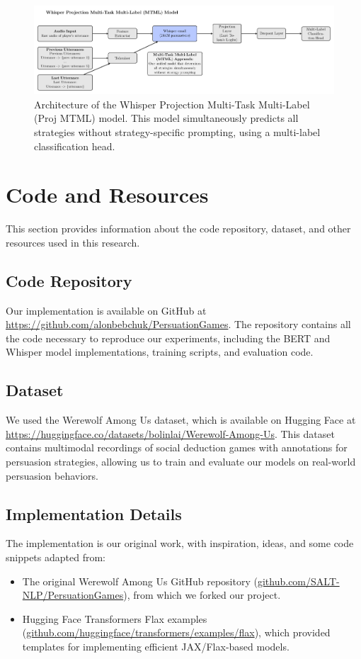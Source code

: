 \documentclass{article}
\begin{document}
\begin{figure}[H]
    \centering
    \includegraphics[width=\textwidth]{figures/pdf/whisper_proj_mtml.pdf}
    \caption{Architecture of the Whisper Projection Multi-Task Multi-Label (Proj MTML) model. This model simultaneously predicts all strategies without strategy-specific prompting, using a multi-label classification head.}
    \label{fig:app_whisper_proj_mtml}
\end{figure}

\section{Code and Resources}
This section provides information about the code repository, dataset, and other resources used in this research.

\subsection{Code Repository}
Our implementation is available on GitHub at \url{https://github.com/alonbebchuk/PersuationGames}. The repository contains all the code necessary to reproduce our experiments, including the BERT and Whisper model implementations, training scripts, and evaluation code.

\subsection{Dataset}
We used the Werewolf Among Us dataset, which is available on Hugging Face at \url{https://huggingface.co/datasets/bolinlai/Werewolf-Among-Us}. This dataset contains multimodal recordings of social deduction games with annotations for persuasion strategies, allowing us to train and evaluate our models on real-world persuasion behaviors.

\subsection{Implementation Details}
The implementation is our original work, with inspiration, ideas, and some code snippets adapted from:
\begin{itemize}
    \item The original Werewolf Among Us GitHub repository (\href{https://github.com/SALT-NLP/PersuationGames}{github.com/SALT-NLP/PersuationGames}), from which we forked our project.
    \item Hugging Face Transformers Flax examples (\href{https://github.com/huggingface/transformers/tree/main/examples/flax}{github.com/huggingface/transformers/examples/flax}), which provided templates for implementing efficient JAX/Flax-based models.
\end{itemize}
\end{document}
